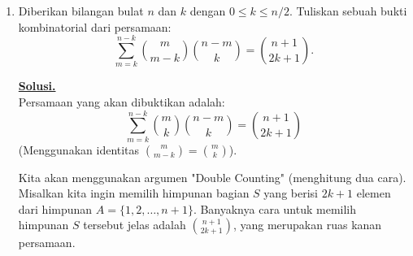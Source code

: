 \documentclass[12pt,twoside]{article}
\newenvironment{solution}
{
	\par\noindent\textbf{\underline{Solusi.}}\\
}
{
	\par
}
\begin{document}
\begin{enumerate}
\begin{solution}
          Sekarang kita akan menunjukkan bahwa $H \subseteq S$.
          Ambil sebarang $h \in H$.
          Jika $G=H$, maka $G \setminus H = \emptyset$, dan $S$ bisa saja sebarang subgrup sejati. Namun, soal secara implisit mengasumsikan $G \setminus H$ tidak kosong (kasus non-trivial). Jika $G=H$, pernyataan trivial benar jika diasumsikan $G-H$ harus "mengisi" $S$. Jika kita asumsikan $H \subsetneq G$, maka $G \setminus H$ tak kosong.
          Pilih sebuah elemen $x \in G \setminus H$.
          Maka $x \in S$ (karena $S \supseteq G \setminus H$).
          Perhatikan elemen $y = x \cdot h$.
          \begin{itemize}
            \item Jika $y \in H$, maka $x = y h^{-1} \in H$ (karena $H$ subgrup). Ini kontradiksi dengan $x \in G \setminus H$.
            \item Maka haruslah $y \in G \setminus H$.
          \end{itemize}
          Akibatnya, $y \in S$ (karena $G \setminus H \subseteq S$).
          Karena $x \in S$ dan $y = xh \in S$, serta $S$ adalah subgrup, maka
          \[ h = x^{-1} y \in S. \]
          Jadi, untuk setiap $h \in H$, berlaku $h \in S$. Ini berarti $H \subseteq S$.
          Kita telah memiliki $G \setminus H \subseteq S$ (dari hipotesis) dan $H \subseteq S$ (baru saja dibuktikan).
          Maka $S$ memuat gabungan kedua himpunan tersebut:
          \[ S \supseteq (G \setminus H) \cup H = G. \]
          Sehingga $S = G$.
          Hal ini bertentangan dengan asumsi awal bahwa $S \neq G$.
          Jadi, pengandaian salah, dan tidak ada subgrup $S$ proper yang memenuhi kondisi tersebut.
        \end{solution}

  \item Diberikan bilangan bulat $n$ dan $k$ dengan $0 \leq k \leq n/2$. Tuliskan sebuah bukti kombinatorial dari persamaan:
        \[
          \sum_{m=k}^{n-k} \binom{m}{m - k} \binom{n - m}{k} = \binom{n + 1}{2k + 1}.
        \]

        \begin{solution}
          Persamaan yang akan dibuktikan adalah:
          \[ \sum_{m=k}^{n-k} \binom{m}{k} \binom{n - m}{k} = \binom{n + 1}{2k + 1} \]
          (Menggunakan identitas $\binom{m}{m-k} = \binom{m}{k}$).

          Kita akan menggunakan argumen "Double Counting" (menghitung dua cara).
          Misalkan kita ingin memilih himpunan bagian $S$ yang berisi $2k+1$ elemen dari himpunan $A = \{1, 2, \dots, n+1\}$.
          Banyaknya cara untuk memilih himpunan $S$ tersebut jelas adalah $\binom{n+1}{2k+1}$, yang merupakan ruas kanan persamaan.


\end{solution}
\end{enumerate}
\end{document}

